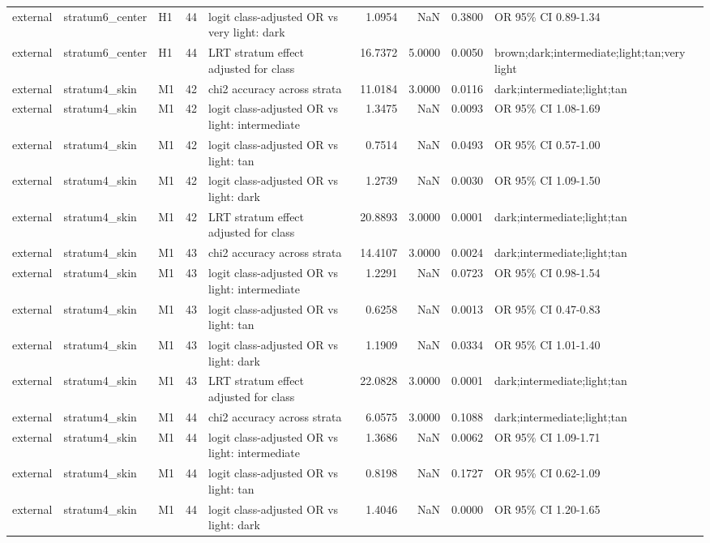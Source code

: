 \begin{tabular}{lllrlrrrl}
external & stratum6\_center & H1 & 44 & logit class-adjusted OR vs very light: dark & 1.0954 & NaN & 0.3800 & OR 95\% CI 0.89-1.34 \\
external & stratum6\_center & H1 & 44 & LRT stratum effect adjusted for class & 16.7372 & 5.0000 & 0.0050 & brown;dark;intermediate;light;tan;very light \\
external & stratum4\_skin & M1 & 42 & chi2 accuracy across strata & 11.0184 & 3.0000 & 0.0116 & dark;intermediate;light;tan \\
external & stratum4\_skin & M1 & 42 & logit class-adjusted OR vs light: intermediate & 1.3475 & NaN & 0.0093 & OR 95\% CI 1.08-1.69 \\
external & stratum4\_skin & M1 & 42 & logit class-adjusted OR vs light: tan & 0.7514 & NaN & 0.0493 & OR 95\% CI 0.57-1.00 \\
external & stratum4\_skin & M1 & 42 & logit class-adjusted OR vs light: dark & 1.2739 & NaN & 0.0030 & OR 95\% CI 1.09-1.50 \\
external & stratum4\_skin & M1 & 42 & LRT stratum effect adjusted for class & 20.8893 & 3.0000 & 0.0001 & dark;intermediate;light;tan \\
external & stratum4\_skin & M1 & 43 & chi2 accuracy across strata & 14.4107 & 3.0000 & 0.0024 & dark;intermediate;light;tan \\
external & stratum4\_skin & M1 & 43 & logit class-adjusted OR vs light: intermediate & 1.2291 & NaN & 0.0723 & OR 95\% CI 0.98-1.54 \\
external & stratum4\_skin & M1 & 43 & logit class-adjusted OR vs light: tan & 0.6258 & NaN & 0.0013 & OR 95\% CI 0.47-0.83 \\
external & stratum4\_skin & M1 & 43 & logit class-adjusted OR vs light: dark & 1.1909 & NaN & 0.0334 & OR 95\% CI 1.01-1.40 \\
external & stratum4\_skin & M1 & 43 & LRT stratum effect adjusted for class & 22.0828 & 3.0000 & 0.0001 & dark;intermediate;light;tan \\
external & stratum4\_skin & M1 & 44 & chi2 accuracy across strata & 6.0575 & 3.0000 & 0.1088 & dark;intermediate;light;tan \\
external & stratum4\_skin & M1 & 44 & logit class-adjusted OR vs light: intermediate & 1.3686 & NaN & 0.0062 & OR 95\% CI 1.09-1.71 \\
external & stratum4\_skin & M1 & 44 & logit class-adjusted OR vs light: tan & 0.8198 & NaN & 0.1727 & OR 95\% CI 0.62-1.09 \\
external & stratum4\_skin & M1 & 44 & logit class-adjusted OR vs light: dark & 1.4046 & NaN & 0.0000 & OR 95\% CI 1.20-1.65 \\

\end{tabular}

